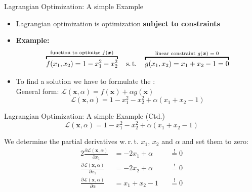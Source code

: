 \begin{frame}{Lagrangian Optimization: A simple Example}{}
	\begin{itemize}
		\item Lagrangian optimization is optimization \textbf{subject to constraints}
		\item \textbf{Example:}
		\begin{equation}
			\overbracket{f(x_1, x_2) = 1 - x_1^2 - x_2^2}^{\text{function to optimize $f(\bm{x})$}}
			\quad \text{s.\,t.} \quad
			\overbracket{g(x_1, x_2) = x_1 + x_2 - 1 = 0}^{\text{linear constraint $g(\bm{x}) = 0$}}
		\end{equation}
		\item To find a solution we have to formulate the : \\
			{\footnotesize General form: $\mathcal{L}(\bm{x}, \alpha) = f(\bm{x}) + \alpha g(\bm{x})$}
		\begin{equation}
			\mathcal{L}(\bm{x}, \alpha) = 1 - x_1^2 - x_2^2 + \alpha(x_1 + x_2 - 1)
		\end{equation}
	\end{itemize}
\end{frame}


\begin{frame}{Lagrangian Optimization: A simple Example (Ctd.)}{}
	\begin{equation*}
		\mathcal{L}(\bm{x}, \alpha) = 1 - x_1^2 - x_2^2 + \alpha(x_1 + x_2 - 1)
	\end{equation*}
	
	We determine the partial derivatives w.\,r.\,t. $x_1$, $x_2$ and $\alpha$ and set them to zero:
	\begin{alignat}{2}
		\frac{\partial \mathcal{L}(\bm{x}, \alpha)}{\partial x_1} 	&= -2 x_1 + \alpha	&&\overset{!}{=} 0 	\\[2mm]
		\frac{\partial \mathcal{L}(\bm{x}, \alpha)}{\partial x_2} 	&= -2 x_2 + \alpha 	&&\overset{!}{=} 0	\\[2mm]
		\frac{\partial \mathcal{L}(\bm{x}, \alpha)}{\partial \alpha} 	&= x_1 + x_2 - 1 	&&\overset{!}{=} 0
	\end{alignat}
\end{frame}


